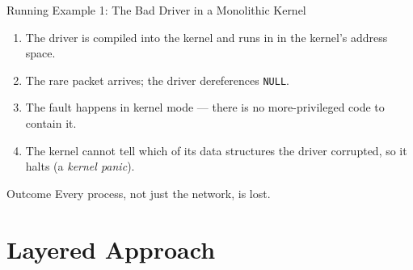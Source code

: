 \documentclass[aspectratio=169]{beamer}
\begin{document}
\begin{frame}{Running Example 1: The Bad Driver in a Monolithic Kernel}
  \begin{enumerate}
    \item The driver is compiled into the kernel and runs in 
      in the kernel's address space.
    \item The rare packet arrives; the driver dereferences \texttt{NULL}.
    \item The fault happens in kernel mode --- there is no more-privileged
      code to contain it.
    \item The kernel cannot tell which of its data structures the driver
      corrupted, so it halts (a \emph{kernel panic}).
  \end{enumerate}
  \vspace{0.15cm}
  \begin{exampleblock}{Outcome}
     Every process, not just the network,
    is lost.
  \end{exampleblock}
\end{frame}

\section{Layered Approach}
\end{document}
